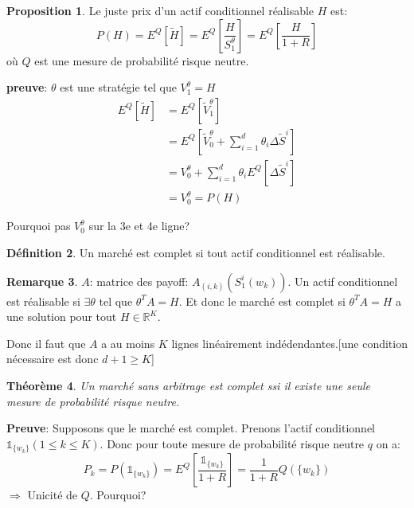 \documentclass{article}
\theoremstyle{plain}
\newtheorem{thm}{Th\'eor\`eme}[section]
\theoremstyle{definition}
\newtheorem{defn}[thm]{D\'efinition}
\newtheorem{propos}[thm]{Proposition}
\newtheorem{remq}[thm]{Remarque}
\begin{document}
\begin{propos}
	Le juste prix d'un actif conditionnel r\'ealisable $H$ est:
	\begin{equation}
	P(H) = E^Q[\tilde{H}]=E^Q[\frac{H}{S_1^\theta}]=E^Q[\frac{H}{1+R}]
	\end{equation}
	o\`u $Q$ est une mesure de probabilit\'e risque neutre.
\end{propos}


\textbf{preuve}: 
$\theta$ est une strat\'egie tel que $V_1^\theta=H$
\begin{equation}
\begin{split}
E^Q[\tilde{H}]&=E^Q[\tilde{V}_1^\theta]\\
&=E^Q[\tilde{V}_0^\theta+\sum_{i=1}^d \theta_i \Delta \tilde{S}^i]\\
&=V_0^\theta+\sum_{i=1}^d \theta_i E^Q[\Delta \tilde{S}^i]\\
&=V_0^\theta=P(H)
\end{split}
\end{equation}

{\color{red} Pourquoi pas $V_0^\theta$ sur la 3e et 4e ligne?}

\begin{defn}
	Un march\'e est complet si tout actif conditionnel est r\'ealisable.
\end{defn}

\begin{remq}
	$A$: matrice des payoff: $A_{(i,k)}(S_1^i(w_k))$. Un actif conditionnel est r\'ealisable si $\exists \theta$ tel que $\theta^T A=H$. Et donc le march\'e est complet si $\theta^T A=H$ a une solution pour tout $H\in \mathbb{R}^K$.	
\end{remq}


Donc il faut que $A$ a au moins $K$ lignes lin\'eairement ind\'edendantes.[une condition n\'ecessaire est donc $d+1\geq K$]

\begin{thm}
	Un march\'e sans arbitrage est complet ssi il existe une seule mesure de probabilit\'e risque neutre.
\end{thm}

\textbf{Preuve}: Supposons que le march\'e est complet. Prenons l'actif conditionnel $\mathds{1}_{\{w_k\}}(1\leq k\leq K)$. Donc pour toute mesure de probabilit\'e risque neutre $q$ on a:
\begin{equation}
P_k=P(\mathds{1}_{\{w_k\}})=E^Q[\frac{\mathds{1}_{\{w_k\}}}{1+R}]=\frac{1}{1+R}Q(\{w_k\})
\end{equation}
$\Rightarrow$ Unicit\'e de $Q$. {\color{red} Pourquoi?}
\end{document}
